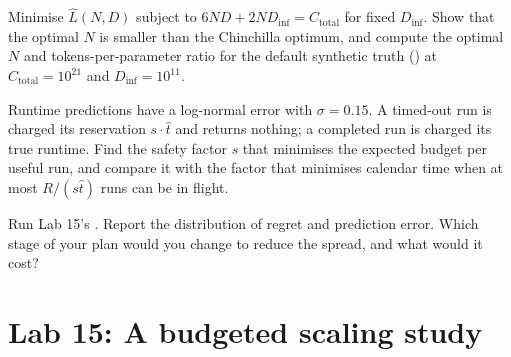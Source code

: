 \begin{exercise}
Minimise $\hat L(N,D)$ subject to $6ND + 2ND_{\text{inf}} = C_{\text{total}}$ for fixed
$D_{\text{inf}}$. Show that the optimal $N$ is smaller than the Chinchilla optimum, and compute
the optimal $N$ and tokens-per-parameter ratio for the default synthetic truth
() at $C_{\text{total}}=10^{21}$ and $D_{\text{inf}}=10^{11}$.
\end{exercise}

\begin{exercise}
Runtime predictions have a log-normal error with $\sigma=0.15$. A timed-out run is charged its
reservation $s\cdot\hat t$ and returns nothing; a completed run is charged its true runtime.
Find the safety factor $s$ that minimises the expected budget per useful run, and compare it
with the factor that minimises calendar time when at most $R/(s\hat t)$ runs can be in flight.
\end{exercise}

\begin{exercise}
Run Lab 15's . Report the
distribution of regret and prediction error. Which stage of your plan would you change to
reduce the spread, and what would it cost?
\end{exercise}

\section{Lab 15: A budgeted scaling study}\label{sec:scalinglaws:lab}

